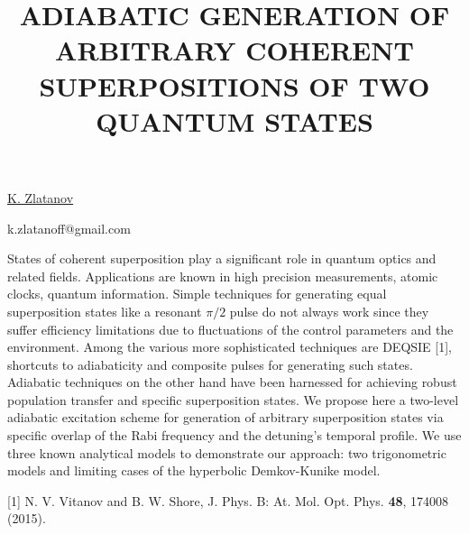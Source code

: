 \title{ADIABATIC GENERATION OF ARBITRARY COHERENT SUPERPOSITIONS OF TWO QUANTUM STATES}

\underline{K. Zlatanov} 

{\normalsize{\vspace{-4mm}
\unisofia

\email k.zlatanoff@gmail.com}}

States of coherent superposition play a significant role in quantum optics and related fields. Applications are known in high precision measurements, atomic clocks, quantum information. Simple techniques for generating equal superposition states like a resonant $\pi/2$ pulse do not always work since they suffer efficiency limitations due to fluctuations of the control parameters and the environment. Among the various more sophisticated techniques are DEQSIE [1], shortcuts to adiabaticity and composite pulses for generating such states.
Adiabatic techniques on the other hand have been harnessed for achieving robust population transfer and specific superposition states. We propose here a two-level adiabatic excitation scheme for generation of arbitrary superposition states via specific overlap of the Rabi frequency and the detuning's temporal profile. We use three known analytical models to demonstrate our approach: two trigonometric models and limiting cases of the hyperbolic Demkov-Kunike model.

{\normalsize
[1] N. V. Vitanov and B. W. Shore, J. Phys. B: At. Mol. Opt. Phys. \textbf{48}, 174008 (2015).
}

\vspace{\baselineskip} 